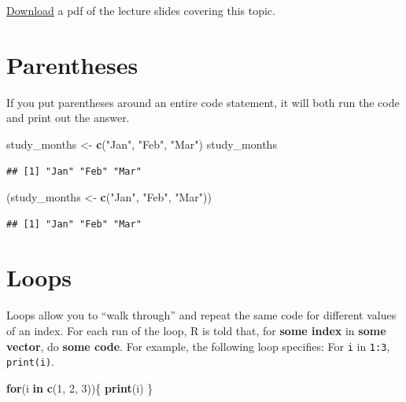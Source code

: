 \documentclass[]{book}
\makeatletter
\newenvironment{Shaded}{\begin{snugshade}}{\end{snugshade}}
\newcommand{\KeywordTok}[1]{\textcolor[rgb]{0.13,0.29,0.53}{\textbf{#1}}}
\newcommand{\DecValTok}[1]{\textcolor[rgb]{0.00,0.00,0.81}{#1}}
\newcommand{\StringTok}[1]{\textcolor[rgb]{0.31,0.60,0.02}{#1}}
\newcommand{\ControlFlowTok}[1]{\textcolor[rgb]{0.13,0.29,0.53}{\textbf{#1}}}
\newcommand{\NormalTok}[1]{#1}
\newenvironment{kframe}{%
\medskip{}
\setlength{\fboxsep}{.8em}
 \def\at@end@of@kframe{}%
 \ifinner\ifhmode%
  \def\at@end@of@kframe{\end{minipage}}%
  \begin{minipage}{\columnwidth}%
 \fi\fi%
 \def\FrameCommand##1{\hskip\@totalleftmargin \hskip-\fboxsep
 \colorbox{shadecolor}{##1}\hskip-\fboxsep
     \hskip-\linewidth \hskip-\@totalleftmargin \hskip\columnwidth}%
 \MakeFramed {\advance\hsize-\width
   \@totalleftmargin\z@ \linewidth\hsize
   \@setminipage}}%
 {\par\unskip\endMakeFramed%
 \at@end@of@kframe}
\renewenvironment{Shaded}{\begin{kframe}}{\end{kframe}}
\theoremstyle{definition}
\theoremstyle{definition}
\theoremstyle{definition}
\theoremstyle{remark}
\makeatother
\begin{document}
\href{https://github.com/geanders/RProgrammingForResearch/raw/master/slides/CourseNotes_Week7.pdf}{Download}
a pdf of the lecture slides covering this topic.

\section{Parentheses}\label{parentheses}

If you put parentheses around an entire code statement, it will both run
the code and print out the answer.

\begin{Shaded}
\begin{Highlighting}[]
\NormalTok{study_months <-}\StringTok{ }\KeywordTok{c}\NormalTok{(}\StringTok{"Jan"}\NormalTok{, }\StringTok{"Feb"}\NormalTok{, }\StringTok{"Mar"}\NormalTok{)}
\NormalTok{study_months}
\end{Highlighting}
\end{Shaded}

\begin{verbatim}
## [1] "Jan" "Feb" "Mar"
\end{verbatim}

\begin{Shaded}
\begin{Highlighting}[]
\NormalTok{(study_months <-}\StringTok{ }\KeywordTok{c}\NormalTok{(}\StringTok{"Jan"}\NormalTok{, }\StringTok{"Feb"}\NormalTok{, }\StringTok{"Mar"}\NormalTok{))}
\end{Highlighting}
\end{Shaded}

\begin{verbatim}
## [1] "Jan" "Feb" "Mar"
\end{verbatim}

\section{Loops}\label{loops}

Loops allow you to ``walk through'' and repeat the same code for
different values of an index. For each run of the loop, R is told that,
for \textbf{some index} in \textbf{some vector}, do \textbf{some code}.
For example, the following loop specifies: For \texttt{i} in
\texttt{1:3}, \texttt{print(i)}.

\begin{Shaded}
\begin{Highlighting}[]
\ControlFlowTok{for}\NormalTok{(i }\ControlFlowTok{in} \KeywordTok{c}\NormalTok{(}\DecValTok{1}\NormalTok{, }\DecValTok{2}\NormalTok{, }\DecValTok{3}\NormalTok{))\{}
        \KeywordTok{print}\NormalTok{(i)}
\NormalTok{\}}
\end{Highlighting}
\end{Shaded}
\end{document}
